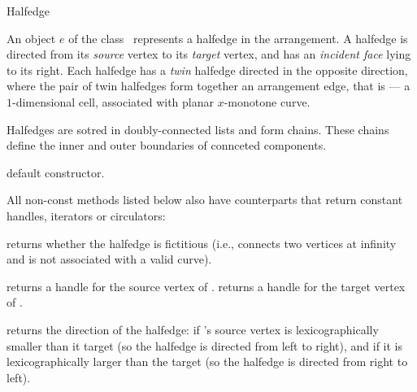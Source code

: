 
\ccRefPageBegin

\begin{ccRefClass}{Halfedge}

\ccThreeToTwo

\ccDefinition
An object $e$ of the class \ccRefName\ represents a halfedge in the
arrangement. A halfedge is directed from its \emph{source} vertex
to its \emph{target} vertex, and has an \emph{incident face} lying to
its right. Each halfedge has a \emph{twin} halfedge directed in the
opposite direction, where the pair of twin halfedges form together
an arrangement edge, that is --- a $1$-dimensional cell, associated
with planar $x$-monotone curve.

Halfedges are sotred in doubly-connected lists and form chains. These
chains define the inner and outer boundaries of connceted components.

\ccInheritsFrom

\ccCreation
{}

   {default constructor.}    	    
    
\ccAccessFunctions

All non-const methods listed below also have  counterparts
that return constant handles, iterators or circulators:

    {returns whether the halfedge is fictitious (i.e., connects two vertices at
     infinity and is not associated with a valid curve).}
    
    {returns a handle for the source vertex of \ccVar{}.}
\ccGlue
{}
    {returns a handle for the target vertex of \ccVar{}.}

    {returns the direction of the halfedge:  if \ccVar{}'s
     source vertex is lexicographically smaller than it target (so the
     halfedge is directed from left to right), and  if it is
     lexicographically larger than the target (so the halfedge is directed
     from right to left).}


\end{ccRefClass}
